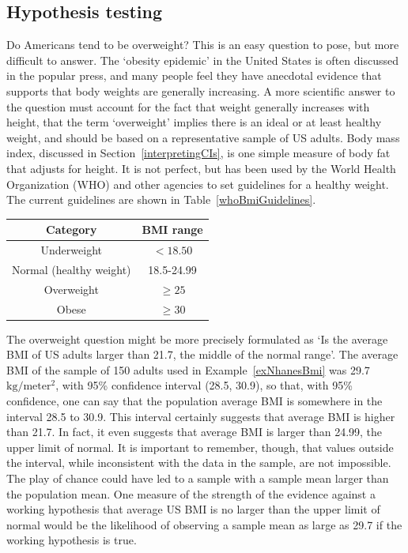 \begin{spacing}{1.5}



 \section[Hypothesis testing]{Hypothesis testing} %
 \label{hypothesisTesting}


Do Americans tend to be overweight?  This is an easy question to pose, but more difficult to answer.  The `obesity epidemic' in the United States is often discussed in the popular press, and many people feel they have anecdotal evidence that supports that body weights are generally increasing.  A more scientific answer to the question must account for the fact that weight generally increases with height,  that the term `overweight' implies there is an ideal or at least healthy weight, and should be based on a representative sample of US adults.  Body mass index, discussed in Section~\ref{interpretingCIs}, is one simple measure of body fat that adjusts for height.  It is not perfect, but has been used by the World Health Organization (WHO) and other agencies to set guidelines for a healthy weight. %
The current guidelines are shown in Table~\ref{whoBmiGuidelines}.

\begin{center}
\begin{tabular}{|c|c|}
\hline 
Category & BMI range\tabularnewline
\hline 
\hline 
Underweight & $<18.50$\tabularnewline
\hline 
Normal (healthy weight) & 18.5-24.99\tabularnewline
\hline 
Overweight & $\geq 25$\tabularnewline
\hline 
Obese & $\geq30$\tabularnewline
\hline 
\end{tabular}
\label{whoBmiGuidelines}
\end{center}

The overweight question might be more precisely formulated as `Is the average BMI of US adults larger than 21.7, the middle of the normal range'.  The average BMI of the sample of 150 adults used in Example~\ref{exNhanesBmi} was 29.7 $\text{kg}/\text{meter}{^2}$, with 95\% confidence interval (28.5, 30.9), so that, with 95\% confidence, one can say that the population average BMI is somewhere in the interval 28.5 to 30.9.  This interval certainly suggests that average BMI is higher than 21.7.  In fact, it even suggests that average BMI is larger than 24.99, the upper limit of normal.  It is important to remember, though, that values outside the interval, while inconsistent with the data in the sample, are not impossible.  The play of chance could have led to a sample with a sample mean larger than the population mean.  One measure of the strength of the evidence against a working hypothesis that average US BMI is no larger than the upper limit of normal would be the likelihood of observing a sample mean as large as 29.7 if the working hypothesis is true.


\end{spacing}
